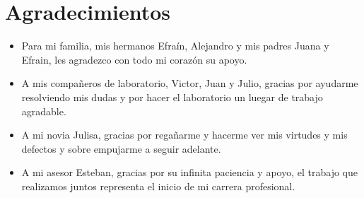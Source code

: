 \chapter{Agradecimientos}
    
    \begin{itemize}
        \item Para mi familia, mis hermanos Efraín, Alejandro y mis padres Juana y Efrain, les agradezco con todo mi corazón su apoyo.
        \item A mis compañeros de laboratorio, Victor, Juan y Julio, gracias por ayudarme resolviendo mis dudas y por hacer el laboratorio un luegar de trabajo agradable.
        \item A mi novia Julisa, gracias por regañarme y hacerme ver mis virtudes y mis defectos y sobre empujarme a seguir adelante.
        \item A mi asesor Esteban, gracias por su infinita paciencia y apoyo, el trabajo que realizamos juntos representa el inicio de mi carrera profesional.
    \end{itemize}

